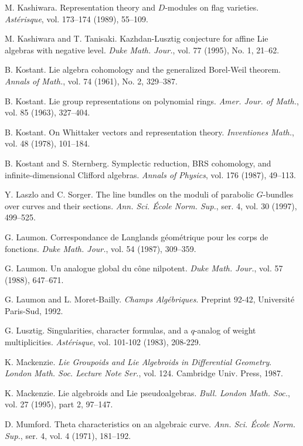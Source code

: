 \begin{description}[leftmargin=3.2em,itemsep=2pt]
\item[{[Kas]}] M. Kashiwara. Representation theory and $D$-modules on flag varieties. \emph{Astérisque}, vol. 173--174 (1989), 55--109.
\item[{[KT95]}] M. Kashiwara and T. Tanisaki. Kazhdan-Lusztig conjecture for affine Lie algebras with negative level. \emph{Duke Math. Jour.}, vol. 77 (1995), No. 1, 21--62.
\item[{[Ko61]}] B. Kostant. Lie algebra cohomology and the generalized Borel-Weil theorem. \emph{Annals of Math.}, vol. 74 (1961), No. 2, 329--387.
\item[{[Ko63]}] B. Kostant. Lie group representations on polynomial rings. \emph{Amer. Jour. of Math.}, vol. 85 (1963), 327--404.
\item[{[Ko78]}] B. Kostant. On Whittaker vectors and representation theory. \emph{Inventiones Math.}, vol. 48 (1978), 101--184.
\item[{[KS]}] B. Kostant and S. Sternberg. Symplectic reduction, BRS cohomology, and infinite-dimensional Clifford algebras. \emph{Annals of Physics}, vol. 176 (1987), 49--113.
\item[{[La-So]}] Y. Laszlo and C. Sorger. The line bundles on the moduli of parabolic $G$-bundles over curves and their sections. \emph{Ann. Sci. École Norm. Sup.}, ser. 4, vol. 30 (1997), 499--525.
\item[{[La87]}] G. Laumon. Correspondance de Langlands géométrique pour les corps de fonctions. \emph{Duke Math. Jour.}, vol. 54 (1987), 309--359.
\item[{[La88]}] G. Laumon. Un analogue global du cône nilpotent. \emph{Duke Math. Jour.}, vol. 57 (1988), 647--671.
\item[{[LMB93]}] G. Laumon and L. Moret-Bailly. \emph{Champs Algébriques}. Preprint 92-42, Université Paris-Sud, 1992.
\item[{[Lu83]}] G. Lusztig. Singularities, character formulas, and a $q$-analog of weight multiplicities. \emph{Astérisque}, vol. 101-102 (1983), 208-229.
\item[{[Ma87]}] K. Mackenzie. \emph{Lie Groupoids and Lie Algebroids in Differential Geometry}. \emph{London Math. Soc. Lecture Note Ser.}, vol. 124. Cambridge Univ. Press, 1987.
\item[{[Ma96]}] K. Mackenzie. Lie algebroids and Lie pseudoalgebras. \emph{Bull. London Math. Soc.}, vol. 27 (1995), part 2, 97--147.
\item[{[Mu]}] D. Mumford. Theta characteristics on an algebraic curve. \emph{Ann. Sci. École Norm. Sup.}, ser. 4, vol. 4 (1971), 181--192.

\end{description}
